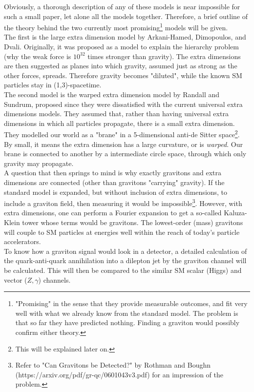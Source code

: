 \documentclass[11pt,a4paper]{article}
\begin{document}
Obviously, a thorough description of any of these models is near impossible for such a small paper, let alone all the models together. Therefore, a brief outline of the theory behind the two currently most promising\footnote{"Promising" in the sense that they provide measurable outcomes, and fit very well with what we already know from the standard model. The problem is that so far they have predicted nothing. Finding a graviton would possibly confirm either theory.} models will be given.\\
The first is the large extra dimension model by Arkani-Hamed, Dimopoulos, and Dvali. Originally, it was proposed as a model to explain the hierarchy problem (why the weak force is $10^{32}$ times stronger than gravity). The extra dimensions are then suggested as planes into which gravity, assumed just as strong as the other forces, spreads. Therefore gravity becomes "diluted", while the known SM particles stay in (1,3)-spacetime.\\
The second model is the warped extra dimension model by Randall and Sundrum, proposed since they were dissatisfied with the current universal extra dimensions models. They assumed that, rather than having universal extra dimensions in which all particles propagate,  there is a small extra dimension. They modelled our world as a "brane" in a 5-dimensional anti-de Sitter space\footnote{This will be explained later on.}. By small, it means the extra dimension has a large curvature, or is \emph{warped}. Our brane is connected to another by a intermediate circle space, through which only gravity may propagate.\\
A question that then springs to mind is why exactly gravitons and extra dimensions are connected (other than gravitons "carrying" gravity). If the standard model is expanded, but without inclusion of extra dimensions, to include a graviton field, then measuring it would be impossible\footnote{Refer to "Can Gravitons be Detected?" by Rothman and Boughn (https://arxiv.org/pdf/gr-qc/0601043v3.pdf) for an impression of the problem.}.
However, with extra dimensions, one can perform a Fourier expansion to get a  so-called Kaluza-Klein tower whose terms would be gravitons. The lowest-order (mass) gravitons will couple to SM particles at energies well within the reach of today's particle accelerators.\\
To know how a graviton signal would look in a detector, a detailed calculation of the quark-anti-quark annihilation into a dilepton jet by the graviton channel will be calculated. This will then be compared to the similar SM scalar (Higgs) and vector ($Z,\gamma$) channels.
\end{document}
